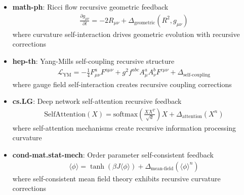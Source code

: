 \begin{theorem}
\begin{itemize}
\item \textbf{math-ph}: Ricci flow recursive geometric feedback
  \begin{align}
  \frac{\partial g_{\mu\nu}}{\partial t} = -2R_{\mu\nu} + \Delta_{\text{geometric}}(R^2, g_{\mu\nu})
  \end{align}
  where curvature self-interaction drives geometric evolution with recursive corrections
  
\item \textbf{hep-th}: Yang-Mills self-coupling recursive structure
  \begin{align}
  \mathcal{L}_{\text{YM}} = -\frac{1}{4}F_{\mu\nu}^a F^{a\mu\nu} + g^2 f^{abc} A_\mu^a A_\nu^b F^{c\mu\nu} + \Delta_{\text{self-coupling}}
  \end{align}
  where gauge field self-interaction creates recursive coupling corrections
  
\item \textbf{cs.LG}: Deep network self-attention recursive feedback
  \begin{align}
  \text{SelfAttention}(X) = \text{softmax}\left(\frac{XX^T}{\sqrt{d}}\right)X + \Delta_{\text{attention}}(X^n)
  \end{align}
  where self-attention mechanisms create recursive information processing curvature
  
\item \textbf{cond-mat.stat-mech}: Order parameter self-consistent feedback
  \begin{align}
  \langle \phi \rangle = \tanh(\beta J \langle \phi \rangle) + \Delta_{\text{mean-field}}(\langle \phi \rangle^n)
  \end{align}
  where self-consistent mean field theory exhibits recursive curvature corrections
\end{itemize}
\end{theorem}


